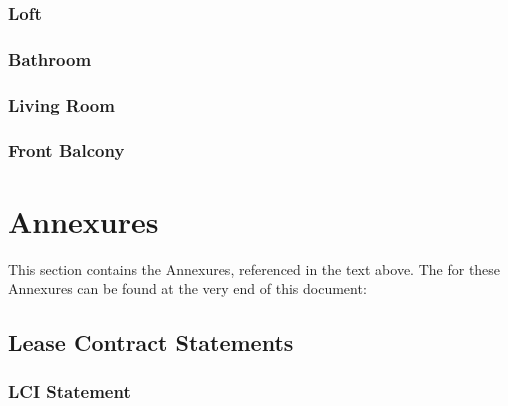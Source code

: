 \documentclass[letterpaper,10pt,openany,oneside,english]{sphinxmanual}
\begin{document}
\subsection{Loft}
\label{\detokenize{categories:loft}}

\subsection{Bathroom}
\label{\detokenize{categories:bathroom}}

\subsection{Living Room}
\label{\detokenize{categories:living-room}}

\subsection{Front Balcony}
\label{\detokenize{categories:front-balcony}}

\chapter{Annexures}
\label{\detokenize{annex:annexures}}\label{\detokenize{annex::doc}}
\sphinxAtStartPar
This section contains the Annexures, referenced in the text above.
The {\hyperref[\detokenize{annex:download-links}]{}} for these Annexures can be found at the very end of this document:


\section{Lease Contract Statements}
\label{\detokenize{annex:lease-contract-statements}}

\subsection{LC\sphinxhyphen{}I Statement}
\label{\detokenize{annex:lc-i-statement}}
\end{document}
